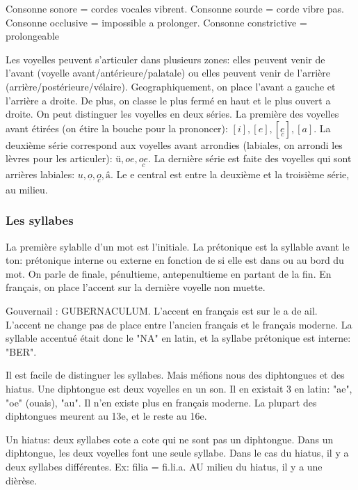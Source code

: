 \documentclass[a4paper]{report}
\theoremstyle{definition}
\theoremstyle{remark}
\begin{document}
Consonne sonore = cordes vocales vibrent. Consonne sourde = corde vibre pas. Consonne occlusive = impossible a prolonger. Consonne constrictive = prolongeable \par

Les voyelles peuvent s'articuler dans plusieurs zones: elles peuvent venir de l'avant (voyelle avant/antérieure/palatale) ou elles peuvent venir de l'arrière (arrière/postérieure/vélaire). Geographiquement, on place l'avant a gauche et l'arrière a droite. De plus, on classe le plus fermé en haut et le plus ouvert a droite. On peut distinguer les voyelles en deux séries. La première des voyelles avant étirées (on étire la bouche pour la prononcer): $[i], [e], [\underset{c}{e}], [a]$. La deuxième série correspond aux voyelles avant arrondies (labiales, on arrondi les lèvres pour les articuler): $ü, oe, \underset{c}{oe}$. La dernière série est faite des voyelles qui sont arrières labiales: $u, \underset{.}{o}, \underset{c}{o}, â$. Le e central est entre la deuxième et la troisième série, au milieu.


\subsubsection{Les syllabes}

La première sylablle d'un mot est l'initiale. La prétonique est la syllable avant le ton: prétonique interne ou externe en fonction de si elle est dans ou au bord du mot. On parle de finale, pénultieme, antepenultieme en partant de la fin. En français, on place l'accent sur la dernière voyelle non muette. \par

Gouvernail : GUBERNACULUM. L'accent en français est sur le a de ail. L'accent ne change pas de place entre l'ancien français et le français moderne. La syllable accentué était donc le "NA" en latin, et la syllabe prétonique est interne: "BER".\par

Il est facile de distinguer les syllabes. Mais méfions nous des diphtongues et des hiatus. Une diphtongue est deux voyelles en un son. Il en existait 3 en latin: "ae", "oe" (ouais), "au". Il n'en existe plus en français moderne. La plupart des diphtongues meurent au 13e, et le reste au 16e.\par

Un hiatus: deux syllabes cote a cote qui ne sont pas un diphtongue. Dans un diphtongue, les deux voyelles font une seule syllabe. Dans le cas du hiatus, il y a deux syllabes différentes. Ex: filia = fi.li.a. AU milieu du hiatus, il y a une dièrèse.\par
\end{document}
